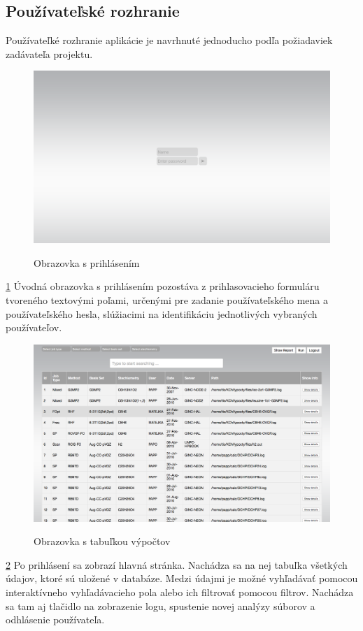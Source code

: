 \documentclass[12pt,a4paper]{article}
\begin{document}
\subsection{Používateľské rozhranie}
Používateľké rozhranie aplikácie je navrhnuté jednoducho podľa požiadaviek zadávateľa projektu.
\begin{figure}[H]
	\caption{Obrazovka s prihlásením}
	\includegraphics[width=\textwidth]{login}
	\label{fig:ui1}
\end{figure}
\ref{fig:ui1}
Úvodná obrazovka s prihlásením pozostáva z prihlasovacieho formuláru tvoreného textovými poľami, určenými pre zadanie používateľského mena a používateľského hesla, slúžiacimi na identifikáciu jednotlivých vybraných používateľov.
\begin{figure}[H]
	\caption{Obrazovka s tabuľkou výpočtov}
	\includegraphics[width=\textwidth]{table}
	\label{fig:ui2}
\end{figure}
\ref{fig:ui2}
Po prihlásení sa zobrazí hlavná stránka. Nachádza sa na nej tabuľka všetkých údajov, ktoré sú uložené v databáze. Medzi údajmi je možné vyhľadávať pomocou interaktívneho vyhľadávacieho pola alebo ich filtrovať pomocou filtrov. Nachádza sa tam aj tlačidlo na zobrazenie logu, spustenie novej analýzy súborov a odhlásenie používateľa.
\end{document}

